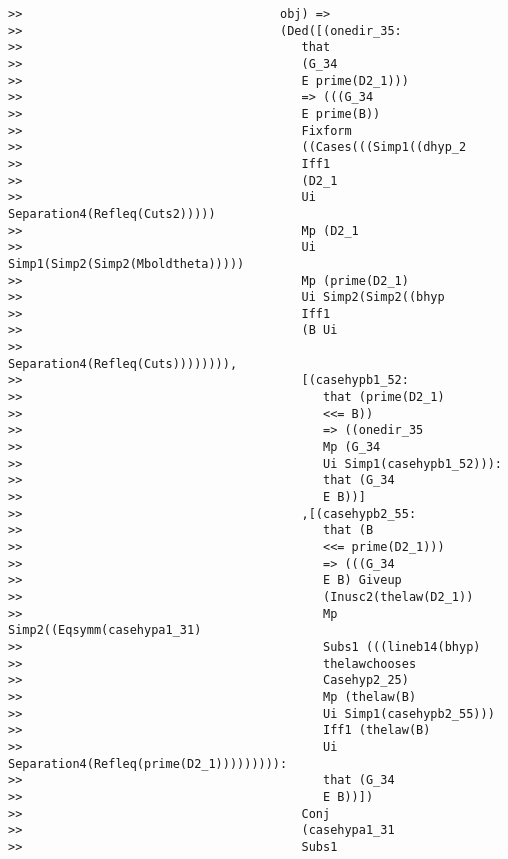 \documentclass[12pt]{article}
\begin{document}
\begin{verbatim}
>>                                    obj) =>
>>                                    (Ded([(onedir_35:
>>                                       that
>>                                       (G_34
>>                                       E prime(D2_1)))
>>                                       => (((G_34
>>                                       E prime(B))
>>                                       Fixform
>>                                       ((Cases(((Simp1((dhyp_2
>>                                       Iff1
>>                                       (D2_1
>>                                       Ui Separation4(Refleq(Cuts2)))))
>>                                       Mp (D2_1
>>                                       Ui Simp1(Simp2(Simp2(Mboldtheta)))))
>>                                       Mp (prime(D2_1)
>>                                       Ui Simp2(Simp2((bhyp
>>                                       Iff1
>>                                       (B Ui
>>                                       Separation4(Refleq(Cuts)))))))),
>>                                       [(casehypb1_52:
>>                                          that (prime(D2_1)
>>                                          <<= B))
>>                                          => ((onedir_35
>>                                          Mp (G_34
>>                                          Ui Simp1(casehypb1_52))):
>>                                          that (G_34
>>                                          E B))]
>>                                       ,[(casehypb2_55:
>>                                          that (B
>>                                          <<= prime(D2_1)))
>>                                          => (((G_34
>>                                          E B) Giveup
>>                                          (Inusc2(thelaw(D2_1))
>>                                          Mp Simp2((Eqsymm(casehypa1_31)
>>                                          Subs1 (((lineb14(bhyp)
>>                                          thelawchooses
>>                                          Casehyp2_25)
>>                                          Mp (thelaw(B)
>>                                          Ui Simp1(casehypb2_55)))
>>                                          Iff1 (thelaw(B)
>>                                          Ui Separation4(Refleq(prime(D2_1))))))))):
>>                                          that (G_34
>>                                          E B))])
>>                                       Conj
>>                                       (casehypa1_31
>>                                       Subs1

\end{verbatim}
\end{document}
